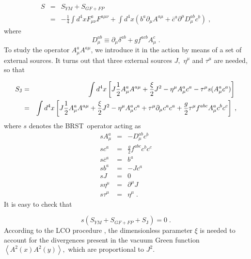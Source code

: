 \documentclass[a4paper,12pt]{article}
\begin{document}
\begin{eqnarray}
S &=&S_{YM}+S_{GF+FP}  \label{lg} \\
&=&-\frac{1}{4}\int d^{4}xF_{\mu \nu }^{a}F^{a\mu \nu }+\int d^{4}x\left(
b^{a}\partial _{\mu }A^{a\mu }+\overline{c}^{a}\partial ^{\mu }D_{\mu
}^{ab}c^{b}\right) \;,  \nonumber
\end{eqnarray}
where 
\begin{equation}
D_{\mu }^{ab}\equiv \partial _{\mu }\delta ^{ab}+gf^{acb}A_{\mu }^{c}\;.
\label{dudal0}
\end{equation}
To study the operator $A_{\mu }^{a}A^{a\mu }$, we introduce it in the action
by means of a set of external sources. It turns out that three external
sources $J,$ $\eta ^{\mu }$ and $\tau ^{\mu }$ are needed, so that

\begin{eqnarray}
S_{\mathrm{J}} &=&\int d^{4}x\left[ J\frac{1}{2}A_{\mu }^{a}A^{a\mu }+\frac{%
\xi }{2}J^{2}-\eta ^{\mu }A_{\mu }^{a}c^{a}-\tau ^{\mu }s(A_{\mu
}^{a}c^{a})\right] \;  \label{lco} \\
&=&\int d^{4}x\left[ J\frac{1}{2}A_{\mu }^{a}A^{a\mu }+\frac{\xi }{2}%
J^{2}-\eta ^{\mu }A_{\mu }^{a}c^{a}+\tau ^{\mu }\partial _{\mu }c^{a}c^{a}+%
\frac{g}{2}\tau ^{\mu }f^{abc}A_{\mu }^{a}c^{b}c^{c}\right] \;,  \nonumber
\end{eqnarray}
where $s$ denotes the BRST\ operator acting as 
\begin{eqnarray}
sA_{\mu }^{a} &=&-D_{\mu }^{ab}c^{b}  \nonumber \\
sc^{a} &=&\frac{g}{2}f^{abc}c^{b}c^{c}  \nonumber \\
s\overline{c}^{a} &=&b^{a}  \nonumber \\
sb^{a} &=&-Jc^{a}\;  \nonumber \\
sJ &=&0\;  \nonumber \\
s\eta ^{\mu } &=&\partial ^{\mu }J\;  \nonumber \\
s\tau ^{\mu } &=&\eta ^{\mu }\;.  \label{s}
\end{eqnarray}
It is easy to check that

\begin{equation}
s\left( S_{YM}+S_{GF+FP}+S_{\mathrm{J}}\right) =0\;.  \label{sinv}
\end{equation}
According to the LCO procedure \cite{v,v1}, the dimensionless parameter $\xi 
$ is needed to account for the divergences present in the vacuum Green
function $\left\langle A^{2}(x)A^{2}(y)\right\rangle ,$ which are
proportional to $J^{2}$.
\end{document}
